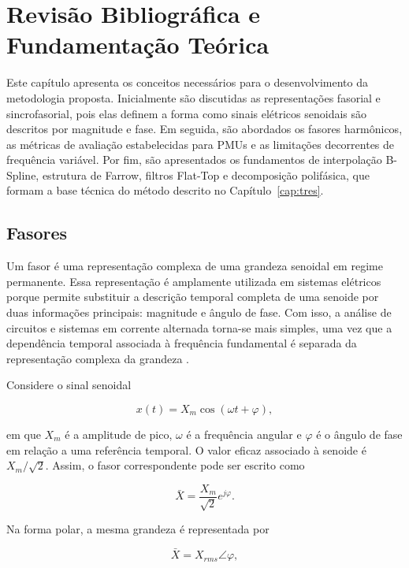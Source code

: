 \chapter{Revisão Bibliográfica e Fundamentação Teórica}\label{cap:cap2}

Este capítulo apresenta os conceitos necessários para o desenvolvimento da metodologia proposta. Inicialmente são discutidas as representações fasorial e sincrofasorial, pois elas definem a forma como sinais elétricos senoidais são descritos por magnitude e fase. Em seguida, são abordados os fasores harmônicos, as métricas de avaliação estabelecidas para PMUs e as limitações decorrentes de frequência variável. Por fim, são apresentados os fundamentos de interpolação B-Spline, estrutura de Farrow, filtros Flat-Top e decomposição polifásica, que formam a base técnica do método descrito no Capítulo~\ref{cap:tres}.

\section{Fasores}

Um fasor é uma representação complexa de uma grandeza senoidal em regime permanente. Essa representação é amplamente utilizada em sistemas elétricos porque permite substituir a descrição temporal completa de uma senoide por duas informações principais: magnitude e ângulo de fase. Com isso, a análise de circuitos e sistemas em corrente alternada torna-se mais simples, uma vez que a dependência temporal associada à frequência fundamental é separada da representação complexa da grandeza \cite{phadke2008}.

Considere o sinal senoidal

\begin{equation}
x(t) = X_m\cos(\omega t + \varphi),
\label{eq:cap2_sinal_senoidal}
\end{equation}

\noindent em que $X_m$ é a amplitude de pico, $\omega$ é a frequência angular e $\varphi$ é o ângulo de fase em relação a uma referência temporal. O valor eficaz associado à senoide é $X_m/\sqrt{2}$. Assim, o fasor correspondente pode ser escrito como

\begin{equation}
\bar{X} = \frac{X_m}{\sqrt{2}}e^{j\varphi}.
\label{eq:cap2_fasor}
\end{equation}

Na forma polar, a mesma grandeza é representada por

\begin{equation}
\bar{X} = X_{rms}\angle\varphi,
\label{eq:cap2_fasor_polar}
\end{equation}

